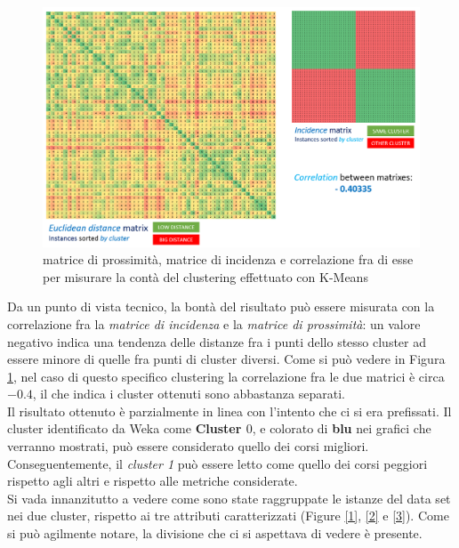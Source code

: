         \begin{figure}
            \centering
            \caption{matrice di prossimità, matrice di incidenza e correlazione fra di esse per misurare la contà del clustering effettuato con K-Means}
            \label{matricidistanze}
            \includegraphics[scale=0.32]{../pres/cluster5.png}
        \end{figure}

        Da un punto di vista tecnico, la bontà del risultato può essere misurata con la correlazione fra la \textit{matrice di incidenza} e la \textit{matrice di prossimità}: un valore negativo indica una tendenza delle distanze fra i punti dello stesso cluster ad essere minore di quelle fra punti di cluster diversi. Come si può vedere in Figura \ref{matricidistanze}, nel caso di questo specifico clustering la correlazione fra le due matrici è circa $-0.4$, il che indica i cluster ottenuti sono abbastanza separati. \\

        Il risultato ottenuto è parzialmente in linea con l'intento che ci si era prefissati. Il cluster identificato da Weka come \textbf{Cluster $0$}, e colorato di \textbf{blu} nei grafici che verranno mostrati, può essere considerato quello dei corsi migliori. Conseguentemente, il \textit{cluster 1} può essere letto come quello dei corsi peggiori rispetto agli altri e rispetto alle metriche considerate. \\

        Si vada innanzitutto a vedere come sono state raggruppate le istanze del data set nei due cluster, rispetto ai tre attributi caratterizzati (Figure \ref{1}, \ref{2} e \ref{3}). Come si può agilmente notare, la divisione che ci si aspettava di vedere è presente.\\

